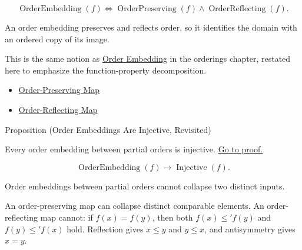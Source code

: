 \begin{remark*}
\[
  \operatorname{OrderEmbedding}(f)
  \iff
  \operatorname{OrderPreserving}(f)\wedge\operatorname{OrderReflecting}(f).
\]
\end{remark*}

\begin{remark*}[Interpretation]
An order embedding preserves and reflects order, so it identifies the domain
with an ordered copy of its image.
\end{remark*}

\begin{remark*}[Exposition]
This is the same notion as \hyperref[def:order-embedding]{Order Embedding} in
the orderings chapter, restated here to emphasize the function-property
decomposition.
\end{remark*}

\begin{dependencies}
\begin{itemize}
  \item \hyperref[def:order-preserving-map-ordered-sets]{Order-Preserving Map}
  \item \hyperref[def:order-reflecting-map]{Order-Reflecting Map}
\end{itemize}
\end{dependencies}

\begin{propositionbox}{Proposition (Order Embeddings Are Injective, Revisited)}
\begin{proposition}\label{prop:order-embedding-injective-revisited}
Every order embedding between partial orders is injective.
\hyperref[prf:order-embedding-injective-revisited]{Go to proof.}
\end{proposition}
\end{propositionbox}

\begin{remark*}
\[
  \operatorname{OrderEmbedding}(f)\to \operatorname{Injective}(f).
\]
\end{remark*}

\begin{remark*}[Interpretation]
Order embeddings between partial orders cannot collapse two distinct inputs.
\end{remark*}

\begin{remark*}[Exposition]
An order-preserving map can collapse distinct comparable elements. An
order-reflecting map cannot: if $f(x)=f(y)$, then both $f(x)\leq' f(y)$ and
$f(y)\leq' f(x)$ hold. Reflection gives $x\leq y$ and $y\leq x$, and
antisymmetry gives $x=y$.
\end{remark*}

